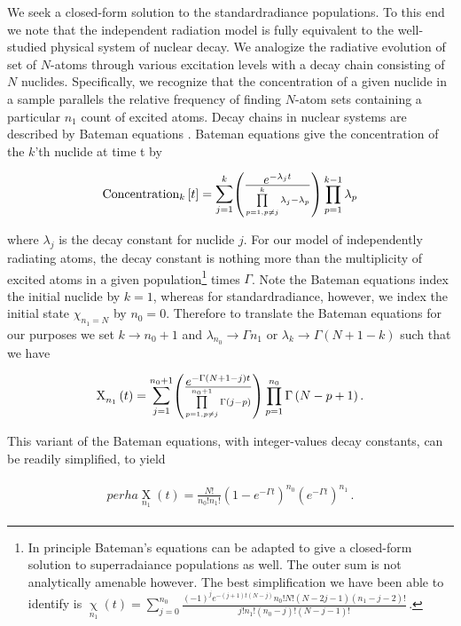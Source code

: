 \documentclass[
  12pt          %
  ,letterpaper  %
  ,center       %
  ,noupper      %
  ,english,fleqn]{uconnthesis}
\newcommand{\LeftEqns}[1]{\begin{fleqn}[\leftmargini minus \leftmargini]\begin{align}#1\end{align}\end{fleqn}}
\newcommand{\LeftEqn}[1]{\LeftEqns{\begin{split}#1\end{split}}}
\newcommand{\ox}[2]{{\operatorname{X}\limits_{#2}^{}}}
\newcommand{\ochi}[2]{{\operatorname{\chi}\limits_{#2}^{}}}
\begin{document}
We seek a closed-form solution to the standardradiance populations. To this end we note that the independent radiation model is fully equivalent to the well-studied physical system of nuclear decay. We analogize the radiative evolution of set of $N$-atoms through various excitation levels with a decay chain consisting of $N$ nuclides. Specifically, we recognize that the concentration of a given nuclide in a sample parallels the relative frequency of finding $N$-atom sets containing a particular $n_1$ count of excited atoms. Decay chains in nuclear systems are described by Bateman equations \cite{Bateman2006}. Bateman equations give the concentration of the $k$'th nuclide at time t by
\LeftEqns{
\mbox{Concentration}_k \left[t\right] = \mathlarger{\sum}\limits_{j=1}^{k}{\begin{pmatrix}
\frac{\mathlarger{e^{-\lambda_j t} }}{\prod\limits_{p=1,p \neq j}^{k}{
\lambda_j-\lambda_p}}
\end{pmatrix}}\prod\limits_{p=1}^{k-1}{\lambda_p}
}
where $\lambda_j$ is the decay constant for nuclide $j$. For our model of independently radiating atoms, the decay constant is nothing more than the multiplicity of excited atoms in a given population\footnote{In principle Bateman's equations can be adapted to give a closed-form solution to superradaiance populations as well. The outer sum is not analytically amenable however. The best simplification we have been able to identify is $\ochi{n_0}{n_1}\left(t\right)=\sum\limits_{j=0}^{n_0} \frac{(-1)^{j} e^{-(j+1) t (N-j)} n_0! N! (N-2 j-1) \left(n_1-j-2\right)! }{j! n_1! \left(n_0-j\right)! (N-j-1)!}\,.$} times $\Gamma$. Note the Bateman equations index the initial nuclide by $k=1$, whereas for standardradiance, however, we index the initial state $\chi_{n_1=N}$ by $n_0 = 0$. Therefore to translate the Bateman equations for our purposes we set $k \rightarrow n_0 + 1$ and $\lambda_{n_0} \rightarrow \Gamma n_1$ or $\lambda_k \rightarrow \Gamma\left(N+1-k\right)$ such that we have
\LeftEqns{
\ox{n_0}{n_1}\left(t\right) = \mathlarger{\sum}\limits_{j=1}^{n_0+1}{\begin{pmatrix}
\frac{\mathlarger{e^{-\Gamma\left(N+1-j\right)t}} }{\prod\limits_{p=1,p\neq j}^{n_0+1}{\Gamma\left(j-p\right)}
}\end{pmatrix}}\prod\limits_{p=1}^{n_0}{\Gamma\left(N-p+1\right)}\,.
}
This variant of the Bateman equations, with integer-values decay constants, can be readily simplified, to yield
\LeftEqn{\label{eq:newsepform}perha
\ox{n_0}{n_1}\left(t\right) = \frac{N!}{n_0!n_1!}{\left(1-e^{-\Gamma t}\right)}^{n_0}{\left(e^{-\Gamma t}\right)}^{n_1}\,.
}
\end{document}
